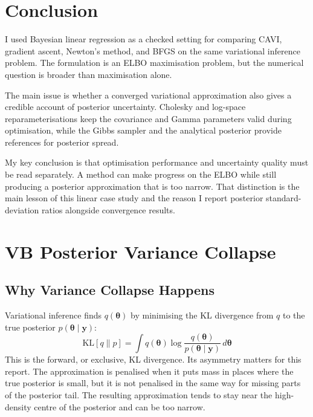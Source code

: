 \documentclass[11pt,a4paper]{article}
\begin{document}
\section{Conclusion}

I used Bayesian linear regression as a checked setting for comparing CAVI, gradient ascent, Newton's method, and BFGS on the same variational inference problem. The formulation is an ELBO maximisation problem, but the numerical question is broader than maximisation alone.

The main issue is whether a converged variational approximation also gives a credible account of posterior uncertainty. Cholesky and log-space reparameterisations keep the covariance and Gamma parameters valid during optimisation, while the Gibbs sampler and the analytical posterior provide references for posterior spread.

My key conclusion is that optimisation performance and uncertainty quality must be read separately. A method can make progress on the ELBO while still producing a posterior approximation that is too narrow. That distinction is the main lesson of this linear case study and the reason I report posterior standard-deviation ratios alongside convergence results.

\newpage
\nocite{*}
\printbibliography
\setcounter{secnumdepth}{1}
\appendix
\renewcommand{\thesection}{Appendix~\Alph{section}}

\newpage
\section{VB Posterior Variance Collapse}
\label{app:vb-collapse}

\subsection*{Why Variance Collapse Happens}

Variational inference finds $q(\bm{\theta})$ by minimising the KL divergence from $q$ to the true posterior $p(\bm{\theta}\mid\bm{y})$:
\begin{equation}
  \mathrm{KL}[q \| p] = \int q(\bm{\theta}) \log \frac{q(\bm{\theta})}{p(\bm{\theta}\mid\bm{y})} \, d\bm{\theta}
\end{equation}
This is the forward, or exclusive, KL divergence. Its asymmetry matters for this report. The approximation is penalised when it puts mass in places where the true posterior is small, but it is not penalised in the same way for missing parts of the posterior tail. The resulting approximation tends to stay near the high-density centre of the posterior and can be too narrow.
\end{document}
